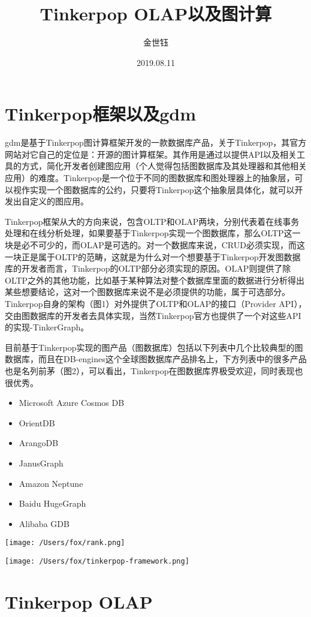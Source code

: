 \documentclass{article}
\title{Tinkerpop OLAP以及图计算}
\author{金世钰}
\date{2019.08.11}
\begin{document}
\maketitle
\section{Tinkerpop框架以及gdm}

gdm是基于Tinkerpop图计算框架开发的一款数据库产品，关于Tinkerpop，其官方网站对它自己的定位是：开源的图计算框架。其作用是通过以提供API以及相关工具的方式，简化开发者创建图应用（个人觉得包括图数据库及其处理器和其他相关应用）的难度。Tinkerpop是一个位于不同的图数据库和图处理器上的抽象层，可以视作实现一个图数据库的公约，只要将Tinkerpop这个抽象层具体化，就可以开发出自定义的图应用。

Tinkerpop框架从大的方向来说，包含OLTP和OLAP两块，分别代表着在线事务处理和在线分析处理，如果要基于Tinkerpop实现一个图数据库，那么OLTP这一块是必不可少的，而OLAP是可选的。对一个数据库来说，CRUD必须实现，而这一块正是属于OLTP的范畴，这就是为什么对一个想要基于Tinkerpop开发图数据库的开发者而言，Tinkerpop的OLTP部分必须实现的原因。OLAP则提供了除OLTP之外的其他功能，比如基于某种算法对整个数据库里面的数据进行分析得出某些想要结论，这对一个图数据库来说不是必须提供的功能，属于可选部分。Tinkerpop自身的架构（图1）对外提供了OLTP和OLAP的接口（Provider API），交由图数据库的开发者去具体实现，当然Tinkerpop官方也提供了一个对这些API的实现-TinkerGraph。

目前基于Tinkerpop实现的图产品（图数据库）包括以下列表中几个比较典型的图数据库，而且在DB-engines这个全球图数据库产品排名上，下方列表中的很多产品也是名列前茅（图2），可以看出，Tinkerpop在图数据库界极受欢迎，同时表现也很优秀。

\begin{itemize}

\item Microsoft Azure Cosmos DB
\item OrientDB
\item ArangoDB
\item JanusGraph
\item Amazon Neptune
\item Baidu HugeGraph
\item Alibaba GDB
\end{itemize}

\texttt{[image: /Users/fox/rank.png]}


\texttt{[image: /Users/fox/tinkerpop-framework.png]}

\section{Tinkerpop OLAP}
\end{document}

